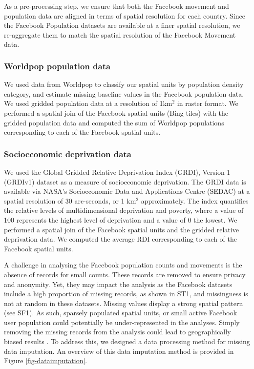 \documentclass[fleqn,10pt]{wlscirep}
\begin{document}
As a pre-processing step, we ensure that both the Facebook movement and population data are aligned in terms of spatial resolution for each country.
Since the Facebook Population datasets are available at a finer spatial resolution, we re-aggregate them to match the spatial resolution of the Facebook Movement data.

\subsubsection*{Worldpop population data}

We used data from Worldpop \cite{tatem2017} to classify our spatial units  by population density category, and  estimate missing baseline values in the Facebook population data.
We used gridded population data at a resolution of 1km$^2$ in raster format.
We performed a spatial join of the Facebook spatial units (Bing tiles) with the gridded population data and computed the sum of Worldpop populations corresponding to each of the Facebook spatial units.

\subsubsection*{Socioeconomic deprivation data} 

We used the Global Gridded Relative Deprivation Index (GRDI), Version 1 (GRDIv1) \cite{RDI2022} dataset as a measure of socioeconomic deprivation.
The GRDI data is available via NASA's Socioeconomic Data and Applications Centre (SEDAC) at a spatial resolution of 30 arc-seconds, or 1 km$^2$ approximately.
The index quantifies the relative levels of multidimensional deprivation and poverty, where a value of 100 represents the highest level of deprivation and a value of 0 the lowest.
We performed a spatial join of the Facebook spatial units and the gridded relative deprivation data. We computed the average RDI corresponding to each of the Facebook spatial units.

A challenge in analysing the Facebook population counts and movements is the absence of records for small counts.
These records are removed to ensure privacy and anonymity. Yet, they may impact the analysis as the Facebook datasets include a high proportion of missing records, as shown in ST1, and missingness is not at random in these datasets. Missing values display a strong spatial pattern (see SF1). As such, sparsely populated spatial units, or small active Facebook user population could potentially be under-represented in the analyses. Simply removing the missing records from the analysis could lead to geographically biased results \cite{afghari2019}.
To address this, we designed a data processing method for missing data imputation. An overview of this data imputation method is provided in Figure \ref{fig-dataimputation}.
\end{document}

